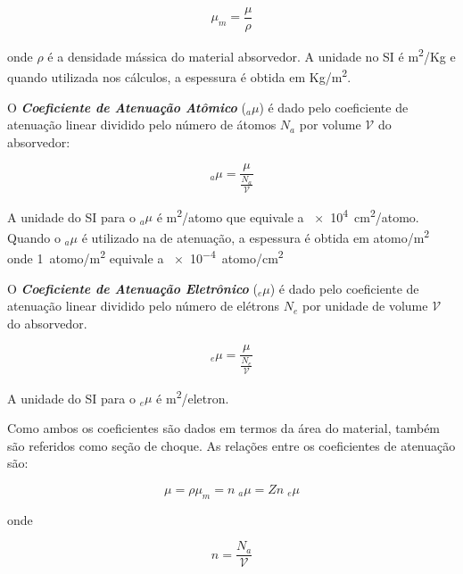 \documentclass[11pt,a4paper]{article}
\begin{document}
                \begin{equation}
                    \mu_m = \frac{\mu}{\rho}
                \end{equation}

            \noindent onde $\rho$ é a densidade mássica do material absorvedor. A unidade no SI é \unit{m^2/Kg} e quando utilizada nos cálculos, a espessura é obtida em \unit{Kg/m^2}.

            O \textbf{\textit{\textcolor{CarnationPink}{Coeficiente de Atenuação Atômico}}} (${}_a\mu$) é dado pelo coeficiente de atenuação linear dividido pelo número de átomos $N_a$ por volume $\mathcal{V}$ do absorvedor:

                \begin{equation}
                    {}_a\mu = \frac{\mu}{\frac{N_a}{\mathcal{V}}}
                \end{equation}

            \noindent A unidade do SI para o ${}_a\mu$ é \unit{m^2/atomo} que equivale a \qty{e4}{cm^2/atomo}. Quando o ${}_a\mu$ é utilizado na  de atenuação, a espessura é obtida em \unit{atomo/m^2} onde \qty{1}{atomo/m^2} equivale a \qty{e-4}{atomo/cm^2}


            O \textbf{\textit{\textcolor{CarnationPink}{Coeficiente de Atenuação Eletrônico}}} (${}_e\mu$) é dado pelo coeficiente de atenuação linear dividido pelo número de elétrons $N_e$ por unidade de volume $\mathcal{V}$ do absorvedor.

            \begin{equation}
                {}_e\mu = \frac{\mu}{\frac{N_e}{\mathcal{V}}}
            \end{equation}

            \noindent A unidade do SI para o ${}_e\mu$ é \unit{m^2/eletron}.

            Como ambos os coeficientes são dados em termos da área do material, também são referidos como seção de choque. As relações entre os coeficientes de atenuação são:

            \begin{equation}
                \mu = \rho \mu_m = n\;{}_a\mu = Zn\;{}_e\mu
            \end{equation}

            \noindent onde 

                \begin{equation}
                    n = \frac{N_a}{\mathcal{V}}
                \end{equation}
\end{document}
